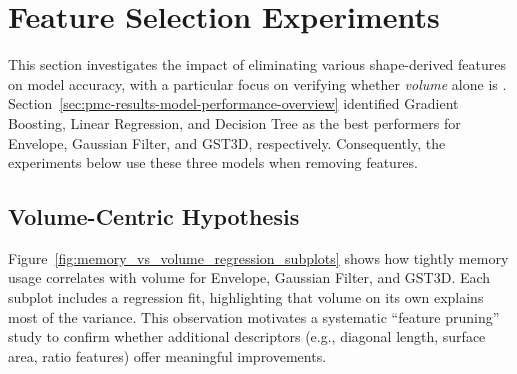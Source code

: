 \section{Feature Selection Experiments}
\label{sec:pmc-results-feature-selection-experiments}


This section investigates the impact of eliminating various shape-derived features on model accuracy, with a particular focus on verifying whether \emph{volume} alone is .
Section~\ref{sec:pmc-results-model-performance-overview} identified Gradient Boosting, Linear Regression, and Decision Tree as the best performers for Envelope, Gaussian Filter, and \ac{GST3D}, respectively.
Consequently, the experiments below use these three models when removing features.

\subsection{Volume-Centric Hypothesis}
\label{subsec:feature-selection-volume-centric-hypothesis}

Figure~\ref{fig:memory_vs_volume_regression_subplots} shows how tightly memory usage correlates with volume for Envelope, Gaussian Filter, and \ac{GST3D}.
Each subplot includes a regression fit, highlighting that volume on its own explains most of the variance.
This observation motivates a systematic “feature pruning” study to confirm whether additional descriptors (e.g., diagonal length, surface area, ratio features) offer meaningful improvements.

